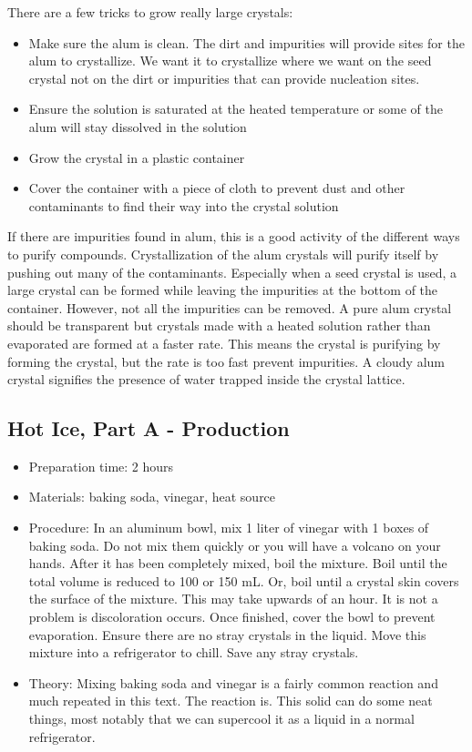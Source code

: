 \begin{itemize}
{There are a few tricks to grow really large crystals:
\begin{itemize}
\item{Make sure the alum is clean. The dirt and impurities will provide sites for the alum to crystallize. We want it to crystallize where we want on the seed crystal not on the dirt or impurities that can provide nucleation sites.}
\item{Ensure the solution is saturated at the heated temperature or some of the alum will stay dissolved in the solution}
\item{Grow the crystal in a plastic container}
\item{Cover the container with a piece of cloth to prevent dust and other contaminants to find their way into the crystal solution}
\end{itemize}
If there are impurities found in alum, this is a good activity of the different ways to purify compounds. Crystallization of the alum crystals will purify itself by pushing out many of the contaminants. Especially when a seed crystal is used, a large crystal can be formed while leaving the impurities at the bottom of the container. However, not all the impurities can be removed. A pure alum crystal should be transparent but crystals made with a heated solution rather than evaporated are formed at a faster rate. This means the crystal is purifying by forming the crystal, but the rate is too fast prevent impurities. A cloudy alum crystal signifies the presence of water trapped inside the crystal lattice. }
\end{itemize}

\subsection{Hot Ice, Part A - Production}
\begin{itemize}
\item{Preparation time: 2 hours}
\item{Materials: baking soda, vinegar, heat source}
\item{Procedure: In an aluminum bowl, mix 1 liter of vinegar with 1 boxes of baking soda. Do not mix them quickly or you will have a volcano on your hands. After it has been completely mixed, boil the mixture. Boil until the total volume is reduced to 100 or 150 mL. Or, boil until a crystal skin covers the surface of the mixture. This may take upwards of an hour. It is not a problem is discoloration occurs. Once finished, cover the bowl to prevent evaporation. Ensure there are no stray crystals in the liquid. Move this mixture into a refrigerator to chill. Save any stray crystals.}
\item{Theory: Mixing baking soda and vinegar is a fairly common reaction and much repeated in this text. The reaction is. This solid can do some neat things, most notably that we can supercool it as a liquid in a normal refrigerator.}
\end{itemize}

